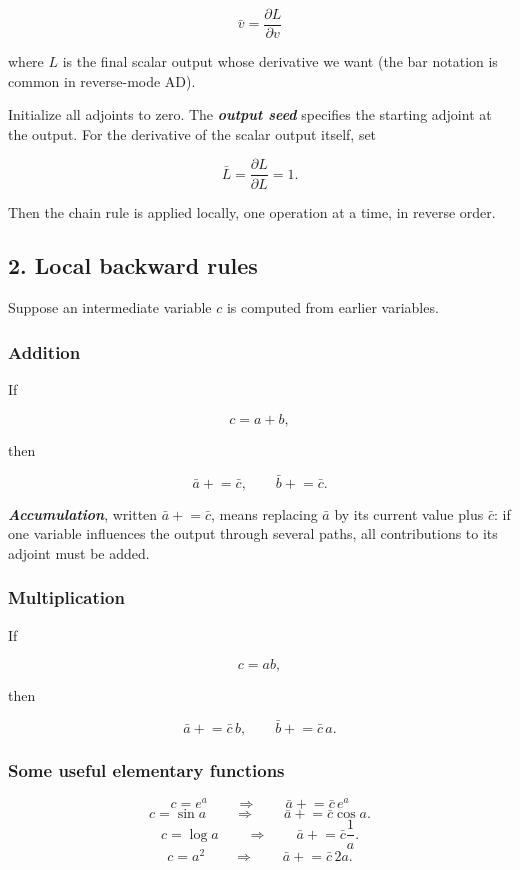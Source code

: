 \documentclass{course_sheet}
\begin{document}
\[
{
\bar v = \frac{\partial L}{\partial v}
}
\]

where $L$ is the final scalar output whose derivative we want (the bar notation is common in reverse-mode AD).

Initialize all adjoints to zero. The \textbf{\textit{output seed}} specifies the starting adjoint at the output. For the derivative of the scalar output itself, set

\[
\bar L
=
\frac{\partial L}{\partial L}
=1.
\]

Then the chain rule is applied locally, one operation at a time, in reverse order.

\subsection*{2. Local backward rules}
Suppose an intermediate variable $c$ is computed from earlier variables.

\subsubsection*{Addition}
If

\[
c=a+b,
\]

then

\[
\bar a \mathrel{+}= \bar c,
\qquad
\bar b \mathrel{+}= \bar c.
\]

\textbf{\textit{Accumulation}}, written $\bar a\mathrel{+}=\bar c$, means replacing $\bar a$ by its current value plus $\bar c$: if one variable influences the output through several paths, all contributions to its adjoint must be added.

\subsubsection*{Multiplication}
If

\[
c=ab,
\]

then

\[
\bar a \mathrel{+}= \bar c\,b,
\qquad
\bar b \mathrel{+}= \bar c\,a.
\]

\subsubsection*{Some useful elementary functions}
\[
c = e^a \qquad \Rightarrow \qquad \bar a \mathrel{+}= \bar c\,e^a
\]
\[
c=\sin a \qquad \Rightarrow \qquad \bar a \mathrel{+}= \bar c\cos a.
\]
\[
c=\log a \qquad \Rightarrow \qquad \bar a \mathrel{+}= \bar c\frac{1}{a}.
\]
\[
c=a^2 \qquad \Rightarrow \qquad \bar a \mathrel{+}= \bar c\,2a.
\]
\end{document}
